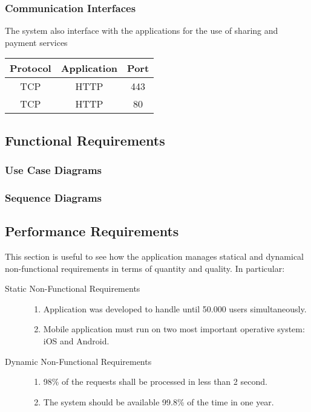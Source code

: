 	\subsubsection{Communication Interfaces}
		The system also interface with the applications for the use of sharing and payment services
		\hfill
		\begin{tabular}{| c | c | c |}
			\hline
			Protocol	& Application	& Port \\
			\hline
			\hline
			TCP		& HTTP		& 443 \\
			\hline
			TCP		& HTTP		& 80 \\
			\hline
		\end{tabular}
	
\subsection{Functional Requirements}
	
	
	\subsubsection{Use Case Diagrams}
		

	\subsubsection{Sequence Diagrams}
				
			
\subsection{Performance Requirements}

	This section is useful to see how the application manages statical and dynamical non-functional requirements in terms of quantity and quality. 
	In particular:
	\begin{description}
		\item[Static Non-Functional Requirements]	\vfill
		\hfill
		\begin{enumerate}
			\item Application was developed to handle until 50.000 users simultaneously.
			\item Mobile application must run on two most important operative system: iOS and Android.
		\end{enumerate}
		
		\item[Dynamic Non-Functional Requirements] \vfill
		\hfill
		\begin{enumerate}
			\item 98\% of the requests shall be processed in less than 2 second.
			\item The system should be available 99.8\% of the time in one year.
		\end{enumerate}			

	\end{description}
		
